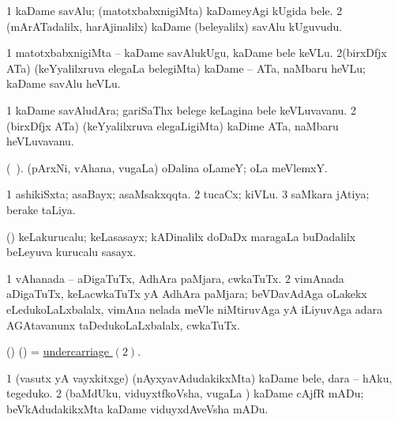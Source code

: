 \bentry
{} 
\gl{\nA}
\expl{}
\bmng
\bnum
\num{1} kaDame savAlu; (matotxbabxnigiMta) kaDameyAgi kUgida bele. 
\num{2} (mArATadalilx, harAjinalilx) kaDame (beleyalilx) savAlu kUguvudu. 
\enum
\emng
\eentry

\bentry
{} 
\gl{\sakirx}
\bmng
\bnum
\num{1} matotxbabxnigiMta -- kaDame savAlukUgu, kaDame bele keVLu. 
\num{2}(birxDfjx ATa) (keYyalilxruva elegaLa belegiMta) kaDame -- ATa, naMbaru heVLu; kaDame savAlu heVLu. 
\enum
\emng
\eentry

\bentry
{} 
\gl{\nA}
\expl{}
\bmng
\bnum
\num{1} kaDame savAludAra; gariSaThx belege keLagina bele keVLuvavanu. 
\num{2} (birxDfjx ATa) (keYyalilxruva elegaLigiMta) kaDime ATa, naMbaru heVLuvavanu. 
\enum
\emng
\eentry

\bentry
{} 
\gl{\nA}
\expl{}
\bmng
 (\bava\ ). (pArxNi, vAhana, \mo vugaLa) oDalina oLameY; oLa meVlemxY. 
\emng
\eentry

\bentry
{} 
\gl{\gu}
\expl{}
\bmng
\bnum
\num{1} ashikiSxta; asaBayx; asaMsakxqqta. 
\num{2} tucaCx; kiVLu. 
\num{3} saMkara jAtiya; berake taLiya. 
\enum
\emng
\eentry

\bentry
{} 
\gl{\nA}
\expl{}
\bmng
 (\ame) keLakurucalu; keLasasayx; kADinalilx doDaDx maragaLa buDadalilx beLeyuva kurucalu sasayx. 
\emng
\eentry

\bentry
{} 
\gl{\nA}
\expl{}
\bmng
\bnum
\num{1} vAhanada -- aDigaTuTx, AdhAra paMjara, cwkaTuTx. 
\hypertarget{undercarriage(2)}{} 
\num{2} vimAnada aDigaTuTx, keLacwkaTuTx yA AdhAra paMjara; beVDavAdAga oLakekx eLedukoLaLxbalalx, vimAna nelada meVle niMtiruvAga yA iLiyuvAga adara AGAtavanunx taDedukoLaLxbalalx, cwkaTuTx. 
\enum
\emng
\eentry

\bentry
{} 
\gl{\nA}
\expl{}
\bmng
 (\birx) (\AmA) = \hyperlink{undercarriage(2)}{undercarriage \((2)\)}. 
\emng
\eentry

\bentry
{} 
\gl{\sakirx}
\expl{}
\bmng
\bnum
\num{1} (vasutx yA vayxkitxge) (nAyxyavAdudakikxMta) kaDame bele, dara -- hAku, tegeduko. 
\num{2} (baMdUku, viduyxtfkoVsha, \mo vugaLa \vi) kaDame cAjfR mADu; beVkAdudakikxMta kaDame viduyxdAveVsha mADu. 
\enum
\emng
\eentry

